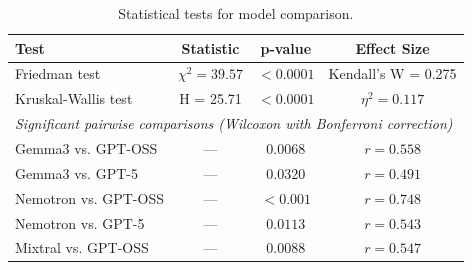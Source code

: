 \begin{table}[h!]
\centering
\caption{Statistical tests for model comparison.}
\label{tab:statistical_tests}
\begin{tabular}{lccc}
\toprule
\textbf{Test} & \textbf{Statistic} & \textbf{p-value} & \textbf{Effect Size} \\
\midrule
Friedman test & $\chi^2 = 39.57$ & $< 0.0001$ & Kendall's W = 0.275 \\
Kruskal-Wallis test & H = 25.71 & $< 0.0001$ & $\eta^2 = 0.117$ \\
\midrule
\multicolumn{4}{l}{\textit{Significant pairwise comparisons (Wilcoxon with Bonferroni correction)}} \\
Gemma3 vs. GPT-OSS & — & $0.0068$ & $r = 0.558$ \\
Gemma3 vs. GPT-5 & — & $0.0320$ & $r = 0.491$ \\
Nemotron vs. GPT-OSS & — & $< 0.001$ & $r = 0.748$ \\
Nemotron vs. GPT-5 & — & $0.0113$ & $r = 0.543$ \\
Mixtral vs. GPT-OSS & — & $0.0088$ & $r = 0.547$ \\
\bottomrule
\end{tabular}
\end{table}